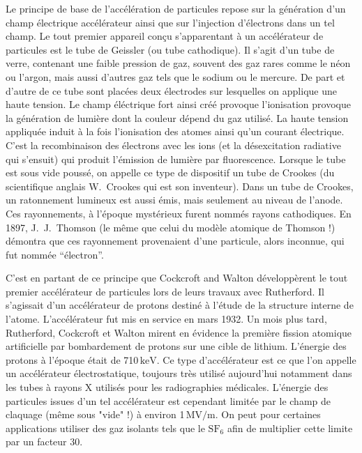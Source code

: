 \documentclass[a4paper]{book}
\begin{document}
Le principe de base de l'accélération de particules repose sur la génération d'un champ électrique accélérateur ainsi que sur l'injection d'électrons dans un tel champ. Le tout premier appareil conçu s'apparentant à un accélérateur de particules est le tube de Geissler (ou tube cathodique). Il s'agit d'un tube de verre, contenant une faible pression de gaz, souvent des gaz rares comme le néon ou l'argon, mais aussi d'autres gaz tels que le sodium ou le mercure. De part et d'autre de ce tube sont placées deux électrodes sur lesquelles on applique une haute tension. Le champ éléctrique fort ainsi créé provoque l'ionisation provoque la génération de lumière dont la couleur dépend du gaz utilisé. La haute tension appliquée induit à la fois l'ionisation des atomes ainsi qu'un courant électrique. C'est la recombinaison des électrons avec les ions (et la désexcitation radiative qui s'ensuit) qui produit l'émission de lumière par fluorescence. Lorsque le tube est sous vide poussé, on appelle ce type de dispositif un tube de Crookes (du scientifique anglais W.~Crookes qui est son inventeur). Dans un tube de Crookes, un ratonnement lumineux est aussi émis, mais seulement au niveau de l'anode. Ces rayonnements, à l'époque mystérieux furent nommés rayons cathodiques. En 1897, J.~J.~Thomson (le même que celui du modèle atomique de Thomson !) démontra que ces rayonnement provenaient d'une particule, alors inconnue, qui fut nommée ``électron''. 

C'est en partant de ce principe que Cockcroft and Walton développèrent le tout premier accélérateur de particules lors de leurs travaux avec Rutherford. Il s'agissait d'un accélérateur de protons destiné à l'étude de la structure interne de l'atome. L'accélérateur fut mis en service en mars 1932. Un mois plus tard, Rutherford, Cockcroft et Walton mirent en évidence la première fission atomique artificielle par bombardement de protons sur une cible de lithium. L'énergie des protons à l'époque était de 710$\,\mathrm{keV}$. Ce type d'accélérateur est ce que l'on appelle un accélérateur électrostatique, toujours très utilisé aujourd'hui notamment dans les tubes à rayons X utilisés pour les radiographies médicales. L'énergie des particules issues d'un tel accélérateur est cependant limitée par le champ de claquage (même sous "vide" !) à environ 1$\,\mathrm{MV/m}$. On peut pour certaines applications utiliser des gaz isolants tels que le $\mathrm{SF}_6$ afin de multiplier cette limite par un facteur 30.
\end{document}
